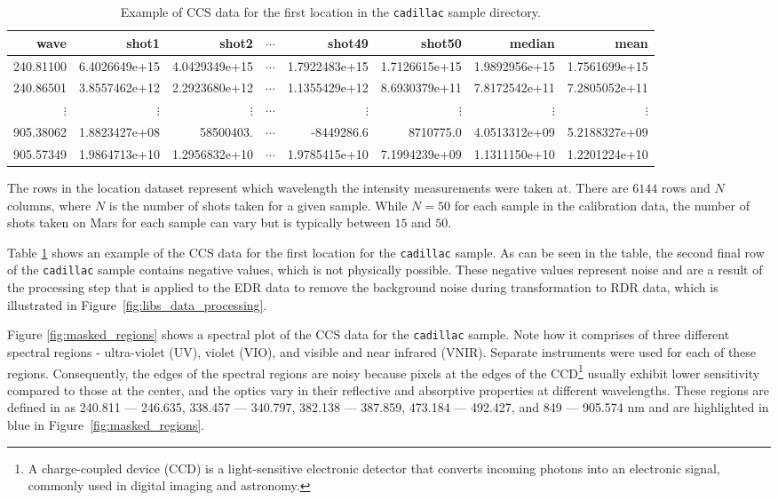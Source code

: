 \begin{table}[!b]
\centering
\begin{tabular}{rrrrrrrr}
\toprule
     wave &         shot1 &         shot2 &  $\cdots$ &        shot49 &       shot50  & median        & mean          \\
\midrule
240.81100 & 6.4026649e+15 & 4.0429349e+15 & $\cdots$  & 1.7922483e+15 & 1.7126615e+15 & 1.9892956e+15 & 1.7561699e+15 \\
240.86501 & 3.8557462e+12 & 2.2923680e+12 & $\cdots$  & 1.1355429e+12 & 8.6930379e+11 & 7.8172542e+11 & 7.2805052e+11 \\
$\vdots$  & $\vdots$      & $\vdots$      & $\cdots$  & $\vdots$      & $\vdots$      & $\vdots$      & $\vdots$      \\
905.38062 & 1.8823427e+08 & 58500403.     & $\cdots$  & -8449286.6    & 8710775.0     & 4.0513312e+09 & 5.2188327e+09 \\
905.57349 & 1.9864713e+10 & 1.2956832e+10 & $\cdots$  & 1.9785415e+10 & 7.1994239e+09 & 1.1311150e+10 & 1.2201224e+10 \\
\bottomrule
\end{tabular}
\caption{Example of CCS data for the first location in the \texttt{cadillac} sample directory.}
\label{tab:ccs_data_example}
\end{table}

The rows in the location dataset represent which wavelength the intensity measurements were taken at.
There are $6144$ rows and $N$ columns, where $N$ is the number of shots taken for a given sample.
While $N=50$ for each sample in the calibration data, the number of shots taken on Mars for each sample can vary but is typically between $15$ and $50$.

Table \ref{tab:ccs_data_example} shows an example of the CCS data for the first location for the \texttt{cadillac} sample.
As can be seen in the table, the second final row of the \texttt{cadillac} sample contains negative values, which is not physically possible.
These negative values represent noise and are a result of the processing step that is applied to the EDR data to remove the background noise during transformation to RDR data, which is illustrated in Figure~\ref{fig:libs_data_processing}.

Figure \ref{fig:masked_regions} shows a spectral plot of the CCS data for the \texttt{cadillac} sample.
Note how it comprises of three different spectral regions - ultra-violet (UV), violet (VIO), and visible and near infrared (VNIR).
Separate instruments were used for each of these regions.
Consequently, the edges of the spectral regions are noisy because pixels at the edges of the CCD\footnote{A charge-coupled device (CCD) is a light-sensitive electronic detector that converts incoming photons into an electronic signal, commonly used in digital imaging and astronomy.\cite{radionuclide_imaging}} usually exhibit lower sensitivity compared to those at the center, and the optics vary in their reflective and absorptive properties at different wavelengths.
These regions are defined in \citet{cleggRecalibrationMarsScience2017} as 240.811 --- 246.635, 338.457 --- 340.797, 382.138 --- 387.859, 473.184 --- 492.427, and 849 --- 905.574 nm and are highlighted in blue in Figure~\ref{fig:masked_regions}.

